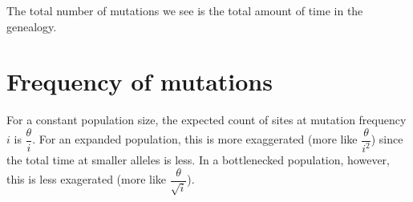 \documentclass{article}
\begin{document}
        The total number of mutations we see is the total amount of time in the genealogy.

    \section{Frequency of mutations}
        For a constant population size, the expected count of sites at mutation frequency $i$ is $\dfrac{\theta}{i}$.  For an expanded population, this is more exaggerated (more like $\dfrac{\theta}{i^2}$) since the total time at smaller alleles is less.  In a bottlenecked population, however, this is less exagerated (more like $\dfrac{\theta}{\sqrt{i}}$).
\end{document}

